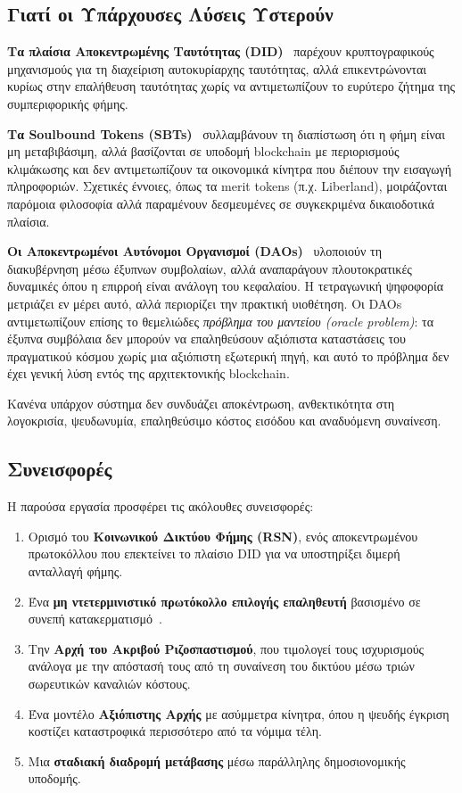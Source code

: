 \documentclass[11pt,a4paper,twocolumn]{article}
\begin{document}
\subsection{Γιατί οι Υπάρχουσες Λύσεις Υστερούν}

\textbf{Τα πλαίσια Αποκεντρωμένης Ταυτότητας (DID)}~\cite{did2022} παρέχουν κρυπτογραφικούς μηχανισμούς για τη διαχείριση αυτοκυρίαρχης ταυτότητας, αλλά επικεντρώνονται κυρίως στην επαλήθευση ταυτότητας χωρίς να αντιμετωπίζουν το ευρύτερο ζήτημα της συμπεριφορικής φήμης.

\textbf{Τα Soulbound Tokens (SBTs)}~\cite{weyl2022} συλλαμβάνουν τη διαπίστωση ότι η φήμη είναι μη μεταβιβάσιμη, αλλά βασίζονται σε υποδομή blockchain με περιορισμούς κλιμάκωσης και δεν αντιμετωπίζουν τα οικονομικά κίνητρα που διέπουν την εισαγωγή πληροφοριών. Σχετικές έννοιες, όπως τα merit tokens (π.χ. Liberland), μοιράζονται παρόμοια φιλοσοφία αλλά παραμένουν δεσμευμένες σε συγκεκριμένα δικαιοδοτικά πλαίσια.

\textbf{Οι Αποκεντρωμένοι Αυτόνομοι Οργανισμοί (DAOs)}~\cite{buterin2014} υλοποιούν τη διακυβέρνηση μέσω έξυπνων συμβολαίων, αλλά αναπαράγουν πλουτοκρατικές δυναμικές όπου η επιρροή είναι ανάλογη του κεφαλαίου. Η τετραγωνική ψηφοφορία~\cite{buterin2019} μετριάζει εν μέρει αυτό, αλλά περιορίζει την πρακτική υιοθέτηση. Οι DAOs αντιμετωπίζουν επίσης το θεμελιώδες \emph{πρόβλημα του μαντείου (oracle problem)}: τα έξυπνα συμβόλαια δεν μπορούν να επαληθεύσουν αξιόπιστα καταστάσεις του πραγματικού κόσμου χωρίς μια αξιόπιστη εξωτερική πηγή, και αυτό το πρόβλημα δεν έχει γενική λύση εντός της αρχιτεκτονικής blockchain.

Κανένα υπάρχον σύστημα δεν συνδυάζει αποκέντρωση, ανθεκτικότητα στη λογοκρισία, ψευδωνυμία, επαληθεύσιμο κόστος εισόδου και αναδυόμενη συναίνεση.

\subsection{Συνεισφορές}

Η παρούσα εργασία προσφέρει τις ακόλουθες συνεισφορές:
\begin{enumerate}[nosep]
\item Ορισμό του \textbf{Κοινωνικού Δικτύου Φήμης (RSN)}, ενός αποκεντρωμένου πρωτοκόλλου που επεκτείνει το πλαίσιο DID για να υποστηρίξει διμερή ανταλλαγή φήμης.
\item Ένα \textbf{μη ντετερμινιστικό πρωτόκολλο επιλογής επαληθευτή} βασισμένο σε συνεπή κατακερματισμό~\cite{karger1997}.
\item Την \textbf{Αρχή του Ακριβού Ριζοσπαστισμού}, που τιμολογεί τους ισχυρισμούς ανάλογα με την απόστασή τους από τη συναίνεση του δικτύου μέσω τριών σωρευτικών καναλιών κόστους.
\item Ένα μοντέλο \textbf{Αξιόπιστης Αρχής} με ασύμμετρα κίνητρα, όπου η ψευδής έγκριση κοστίζει καταστροφικά περισσότερο από τα νόμιμα τέλη.
\item Μια \textbf{σταδιακή διαδρομή μετάβασης} μέσω παράλληλης δημοσιονομικής υποδομής.
\end{enumerate}
\end{document}
